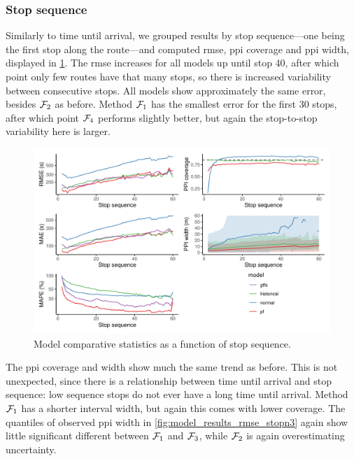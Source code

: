 \subsubsection{Stop sequence}

Similarly to time until arrival, we grouped results by stop sequence---one being the first stop along the route---and computed \gls{rmse}, \gls{ppi} coverage and \gls{ppi} width, displayed in \cref{fig:model_results_rmse_stopn}. The \gls{rmse} increases for all models up until stop 40, after which point only few routes have that many stops, so there is increased variability between consecutive stops. All models show approximately the same error, besides $\mathcal{F}_2$ as before. Method $\mathcal{F}_1$ has the smallest error for the first 30 stops, after which point $\mathcal{F}_4$ performs slightly better, but again the stop-to-stop variability here is larger.



\begin{knitrout}\small
{}\color{fgcolor}\begin{figure}
\includegraphics[width=\textwidth]{figure/model_results_rmse_stopn-1} \caption[Model comparative statistics as a function of stop sequence]{Model comparative statistics as a function of stop sequence.}\label{fig:model_results_rmse_stopn}
\end{figure}


\end{knitrout}

The \gls{ppi} coverage and width show much the same trend as before. This is not unexpected, since there is a relationship between time until arrival and stop sequence: low sequence stops do not ever have a long time until arrival. Method $\mathcal{F}_1$ has a shorter interval width, but again this comes with lower coverage. The quantiles of observed \gls{ppi} width in \cref{fig:model_results_rmse_stopn3} again show little significant different between $\mathcal{F}_1$ and $\mathcal{F}_3$, while $\mathcal{F}_2$ is again overestimating uncertainty.



